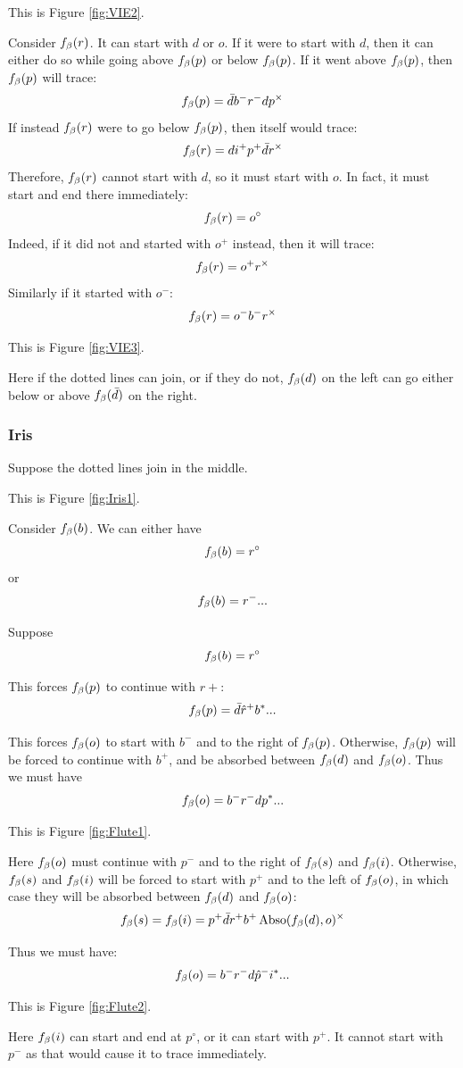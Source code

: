 This is Figure \ref{fig:VIE2}.

Consider $f_\beta(r)$. It can start with $d$ or $o$. If it were to start with $d$, then it can either do so while going above $f_\beta(p)$ or below $f_\beta(p)$. If it went above $f_\beta(p)$, then $f_\beta(p)$ will trace:
\[
f_\beta(p) = \bar{d} b^- r^- d p^\times
\]
If instead $f_\beta(r)$ were to go below $f_\beta(p)$, then itself would trace:
\[
f_\beta(r) = d i^+ p^+ \bar{d} r^\times
\]
Therefore, $f_\beta(r)$ cannot start with $d$, so it must start with $o$. In fact, it must start and end there immediately:
\[
f_\beta(r) = o^\circ
\]
Indeed, if it did not and started with $o^+$ instead, then it will trace:
\[
f_\beta(r) = o^+ r^\times
\]
Similarly if it started with $o^-$:
\[
f_\beta(r) = o^- b^- r^\times
\]

This is Figure \ref{fig:VIE3}.

Here if the dotted lines can join, or if they do not, $f_\beta(d)$ on the left can go either below or above $f_\beta(\bar{d})$ on the right.

\subsubsection{Iris} \label{Iris}
Suppose the dotted lines join in the middle. 

This is Figure \ref{fig:Iris1}.

Consider $f_\beta(b)$. We can either have
\[
f_\beta(b) = r^\circ
\]
or
\[
f_\beta(b) = r^-...
\]

 \label{Flute}
Suppose
\[
f_\beta(b) = r^\circ
\]

This forces $f_\beta(p)$ to continue with $r+$:
\[
f_\beta(p) = \bar{d} \hat{r}^+ b^*...
\]

This forces $f_\beta(o)$ to start with $b^-$ and to the right of $f_\beta(p)$. Otherwise, $f_\beta(p)$ will be forced to continue with $b^+$, and be absorbed between $f_\beta(d)$ and $f_\beta(o)$. Thus we must have
\[
f_\beta(o) = b^- r^- d p^*...
\]

This is Figure \ref{fig:Flute1}.

Here $f_\beta(o)$ must continue with $p^-$ and to the right of $f_\beta(s)$ and $f_\beta(i)$. Otherwise, $f_\beta(s)$ and $f_\beta(i)$ will be forced to start with $p^+$ and to the left of $f_\beta(o)$, in which case they will be absorbed between $f_\beta(d)$ and $f_\beta(o)$:
\[
f_\beta(s) = f_\beta(i) = p^+ \bar{d} r^+ b^+ \operatorname{Abso}(f_\beta(d), o)^\times
\]

Thus we must have:
\[
f_\beta(o) = b^- r^- d \hat{p}^- i^*...
\]

This is Figure \ref{fig:Flute2}.

Here $f_\beta(i)$ can start and end at $p^\circ$, or it can start with $p^+$. It cannot start with $p^-$ as that would cause it to trace immediately.

